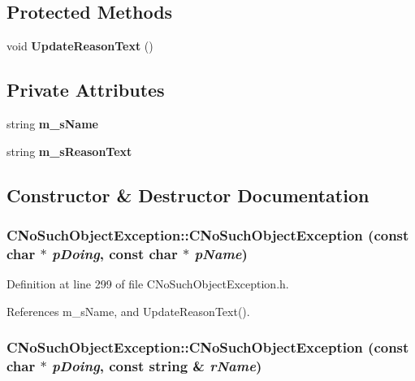 \subsection*{Protected Methods}
\begin{CompactItemize}
\item 
void {\bf Update\-Reason\-Text} ()
\end{CompactItemize}
\subsection*{Private Attributes}
\begin{CompactItemize}
\item 
string {\bf m\_\-s\-Name}
\item 
string {\bf m\_\-s\-Reason\-Text}
\end{CompactItemize}


\subsection{Constructor \& Destructor Documentation}
\subsubsection{\setlength{\rightskip}{0pt plus 5cm}CNo\-Such\-Object\-Exception::CNo\-Such\-Object\-Exception (const char $\ast$ {\em p\-Doing}, const char $\ast$ {\em p\-Name})\hspace{0.3cm}{\tt  [inline]}}\label{classCNoSuchObjectException_a0}




Definition at line 299 of file CNo\-Such\-Object\-Exception.h.

References m\_\-s\-Name, and Update\-Reason\-Text().
\subsubsection{\setlength{\rightskip}{0pt plus 5cm}CNo\-Such\-Object\-Exception::CNo\-Such\-Object\-Exception (const char $\ast$ {\em p\-Doing}, const string \& {\em r\-Name})\hspace{0.3cm}{\tt  [inline]}}\label{classCNoSuchObjectException_a1}




